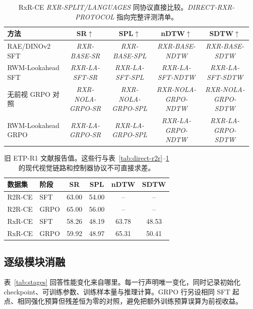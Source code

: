 \documentclass[UTF8,11pt]{ctexart}
\newcommand{\method}{RWM-Lookahead}
\begin{document}
\begin{table}[t]
\centering
\caption{RxR-CE \textit{RXR-SPLIT/LANGUAGES} 同协议直接比较。\textit{DIRECT-RXR-PROTOCOL} 指向完整评测清单。}
\label{tab:direct-rxr}
\begin{tabular}{lcccc}
\toprule
方法 & SR$\uparrow$ & SPL$\uparrow$ & nDTW$\uparrow$ & SDTW$\uparrow$ \\
\midrule
RAE/DINOv2 SFT & \textit{RXR-BASE-SR} & \textit{RXR-BASE-SPL} & \textit{RXR-BASE-NDTW} & \textit{RXR-BASE-SDTW} \\
\method{} SFT & \textit{RXR-LA-SFT-SR} & \textit{RXR-LA-SFT-SPL} & \textit{RXR-LA-SFT-NDTW} & \textit{RXR-LA-SFT-SDTW} \\
无前视 GRPO 对照 & \textit{RXR-NOLA-GRPO-SR} & \textit{RXR-NOLA-GRPO-SPL} & \textit{RXR-NOLA-GRPO-NDTW} & \textit{RXR-NOLA-GRPO-SDTW} \\
\method{} GRPO & \textit{RXR-LA-GRPO-SR} & \textit{RXR-LA-GRPO-SPL} & \textit{RXR-LA-GRPO-NDTW} & \textit{RXR-LA-GRPO-SDTW} \\
\bottomrule
\end{tabular}
\end{table}

\begin{table}[t]
\centering
\caption{旧 ETP-R1 文献报告值\cite{ye2025etpr1}。这些行与表~\ref{tab:direct-r2r}--\ref{tab:direct-rxr} 的现代视觉链路和控制器协议不可直接求差。}
\label{tab:published}
\begin{tabular}{llcccc}
\toprule
数据集 & 阶段 & SR & SPL & nDTW & SDTW \\
\midrule
R2R-CE & SFT & 63.00 & 54.00 & -- & -- \\
R2R-CE & GRPO & 65.00 & 56.00 & -- & -- \\
RxR-CE & SFT & 58.26 & 48.19 & 63.78 & 48.53 \\
RxR-CE & GRPO & 59.92 & 48.97 & 65.31 & 50.41 \\
\bottomrule
\end{tabular}
\end{table}

\subsection{逐级模块消融}

表~\ref{tab:stages} 回答性能变化来自哪里。每一行声明唯一变化，同时记录初始化 checkpoint、可训练参数、训练样本量与推理计算。GRPO 行另设相同 SFT 起点、相同强化预算但残差恒为零的对照，避免把额外训练预算误算为前视收益。
\end{document}
